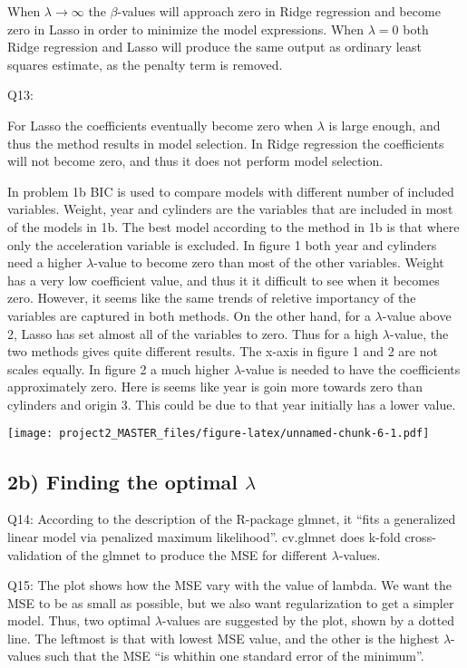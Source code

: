 \documentclass[]{article}
\begin{document}
When \(\lambda \rightarrow \infty\) the \(\beta\)-values will approach
zero in Ridge regression and become zero in Lasso in order to minimize
the model expressions. When \(\lambda = 0\) both Ridge regression and
Lasso will produce the same output as ordinary least squares estimate,
as the penalty term is removed.

Q13:

For Lasso the coefficients eventually become zero when \(\lambda\) is
large enough, and thus the method results in model selection. In Ridge
regression the coefficients will not become zero, and thus it does not
perform model selection.

In problem 1b BIC is used to compare models with different number of
included variables. Weight, year and cylinders are the variables that
are included in most of the models in 1b. The best model according to
the method in 1b is that where only the acceleration variable is
excluded. In figure 1 both year and cylinders need a higher
\(\lambda\)-value to become zero than most of the other variables.
Weight has a very low coefficient value, and thus it it difficult to see
when it becomes zero. However, it seems like the same trends of reletive
importancy of the variables are captured in both methods. On the other
hand, for a \(\lambda\)-value above 2, Lasso has set almost all of the
variables to zero. Thus for a high \(\lambda\)-value, the two methods
gives quite different results. The x-axis in figure 1 and 2 are not
scales equally. In figure 2 a much higher \(\lambda\)-value is needed to
have the coefficients approximately zero. Here is seems like year is
goin more towards zero than cylinders and origin 3. This could be due to
that year initially has a lower value.

\texttt{[image: project2\_MASTER\_files/figure-latex/unnamed-chunk-6-1.pdf]}

\subsection{\texorpdfstring{2b) Finding the optimal
\(\lambda\)}{2b) Finding the optimal \textbackslash{}lambda}}\label{b-finding-the-optimal-lambda}

Q14: According to the description of the R-package glmnet, it ``fits a
generalized linear model via penalized maximum likelihood''. cv.glmnet
does k-fold cross-validation of the glmnet to produce the MSE for
different \(\lambda\)-values.

Q15: The plot shows how the MSE vary with the value of lambda. We want
the MSE to be as small as possible, but we also want regularization to
get a simpler model. Thus, two optimal \(\lambda\)-values are suggested
by the plot, shown by a dotted line. The leftmost is that with lowest
MSE value, and the other is the highest \(\lambda\)-values such that the
MSE ``is whithin one standard error of the minimum''.
\end{document}
